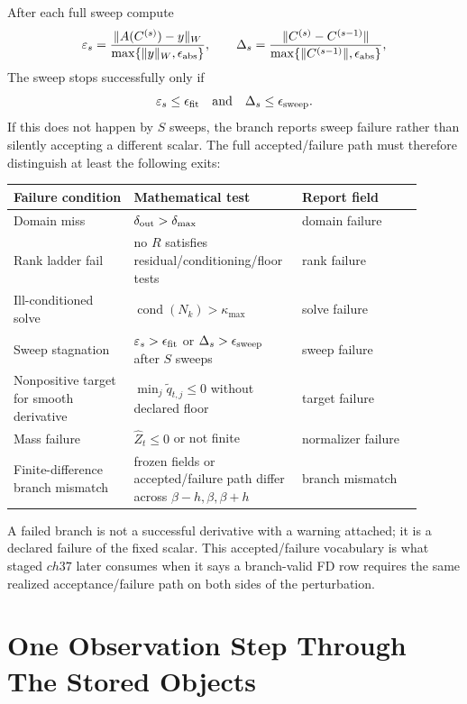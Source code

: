 After each full sweep compute
\begin{equation}
  \varepsilon_s=
  \frac{\|A(C^{(s)})-y\|_W}{\max\{\|y\|_W,\epsilon_{\rm abs}\}},
  \qquad
  \Delta_s=
  \frac{\|C^{(s)}-C^{(s-1)}\|}{\max\{\|C^{(s-1)}\|,\epsilon_{\rm abs}\}},
  \label{eq:bf-hd-squared-tt-stopping-metrics}
\end{equation}
The sweep stops successfully only if
\begin{equation}
  \varepsilon_s\le\epsilon_{\rm fit}
  \quad\text{and}\quad
  \Delta_s\le\epsilon_{\rm sweep}.
  \label{eq:bf-hd-squared-tt-stopping-success}
\end{equation}
If this does not happen by \(S\) sweeps, the branch reports sweep failure rather
than silently accepting a different scalar.  The full accepted/failure path must
therefore distinguish at least the following exits:
\begin{center}
\begin{tabular}{p{0.28\linewidth}p{0.34\linewidth}p{0.28\linewidth}}
\toprule
Failure condition & Mathematical test & Report field\\
\midrule
Domain miss & \(\delta_{\rm out}>\delta_{\max}\) & domain failure\\
Rank ladder fail & no \(R\) satisfies residual/conditioning/floor tests & rank failure\\
Ill-conditioned solve & \(\operatorname{cond}(N_k)>\kappa_{\max}\) & solve failure\\
Sweep stagnation & \(\varepsilon_s>\epsilon_{\rm fit}\) or \(\Delta_s>\epsilon_{\rm sweep}\) after \(S\) sweeps & sweep failure\\
Nonpositive target for smooth derivative & \(\min_j\widetilde q_{t,j}\le0\) without declared floor & target failure\\
Mass failure & \(\widehat Z_t\le0\) or not finite & normalizer failure\\
Finite-difference branch mismatch & frozen fields or accepted/failure path differ across \(\beta-h,\beta,\beta+h\) & branch mismatch\\
\bottomrule
\end{tabular}
\end{center}
A failed branch is not a successful derivative with a warning attached; it is a
declared failure of the fixed scalar.  This accepted/failure vocabulary is what
staged \(ch37\) later consumes when it says a branch-valid FD row requires the
same realized acceptance/failure path on both sides of the perturbation.

\section{One Observation Step Through The Stored Objects}
\label{sec:bf-hd-squared-tt-one-step}

